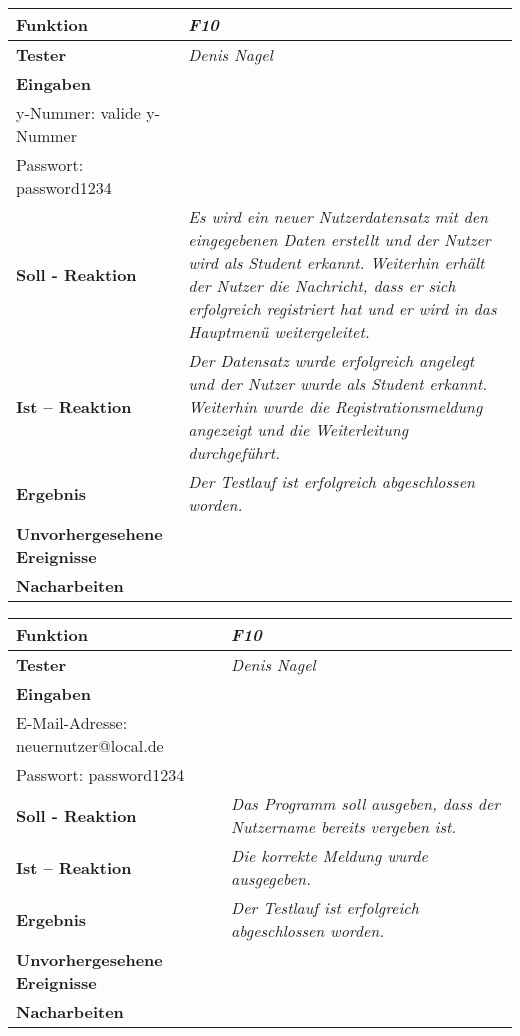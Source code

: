 \begin{longtable}{|p{4cm}|p{11cm}|}
\hline
\textbf{Funktion} & \textit{\textbf{F10}} \\
\hline
\textbf{Tester} & \textit{Denis Nagel} \\
\hline
\textbf{Eingaben} & \textit{Username: Teststudent\\
y-Nummer: valide y-Nummer\\
Passwort: password1234} \\
\hline
\textbf{Soll - Reaktion} & \textit{Es wird ein neuer Nutzerdatensatz mit den eingegebenen Daten erstellt und der Nutzer wird als Student erkannt. Weiterhin erhält der Nutzer die Nachricht, dass er sich erfolgreich registriert hat und er wird in das Hauptmenü weitergeleitet.} \\
\hline
\textbf{Ist -- Reaktion} & \textit{Der Datensatz wurde erfolgreich angelegt und der Nutzer wurde als Student erkannt. Weiterhin wurde die Registrationsmeldung angezeigt und die Weiterleitung durchgeführt.} \\
\hline
\textbf{Ergebnis} & \textit{Der Testlauf ist erfolgreich abgeschlossen worden.} \\
\hline
\textbf{Unvorhergesehene Ereignisse} &
\textit{} \\
\hline
\textbf{Nacharbeiten } & \textit{} \\
\hline
\end{longtable}

\begin{longtable}{|p{4cm}|p{11cm}|}
\hline
\textbf{Funktion} & \textit{\textbf{F10}} \\
\hline
\textbf{Tester} & \textit{Denis Nagel} \\
\hline
\textbf{Eingaben} & \textit{Username: Testnutzer\\
E-Mail-Adresse: neuernutzer@local.de\\
Passwort: password1234} \\
\hline
\textbf{Soll - Reaktion} & \textit{Das Programm soll ausgeben, dass der Nutzername bereits vergeben ist.} \\
\hline
\textbf{Ist -- Reaktion} & \textit{Die korrekte Meldung wurde ausgegeben.} \\
\hline
\textbf{Ergebnis} & \textit{Der Testlauf ist erfolgreich abgeschlossen worden.} \\
\hline
\textbf{Unvorhergesehene Ereignisse} &
\textit{} \\
\hline
\textbf{Nacharbeiten } & \textit{} \\
\hline
\end{longtable}

